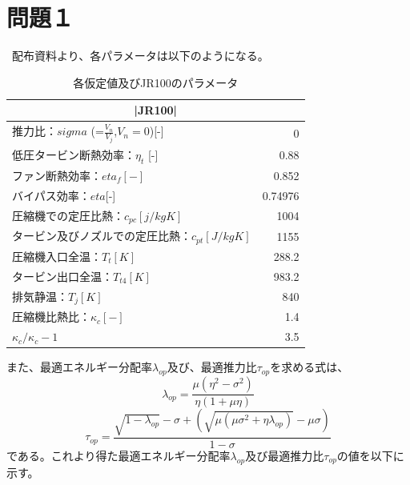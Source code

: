 \section*{\large 問題１}
\ 
配布資料より、各パラメータは以下のようになる。
\begin{table}[htb]
 \begin{center}
  \caption{各仮定値及びJR100のパラメータ}
  \begin{tabular}{|l|r|} \hline
   \multicolumn{2}{|c|}{|JR100|} \\ \hline
   推力比：$sigma$ (=$\frac{V_n}{V_j}$,$V_n=0$)[-] & 0 \\ \hline
   低圧タービン断熱効率：$\eta_t$ [-] & 0.88 \\ \hline
   ファン断熱効率：$eta_f[-]$ & 0.852 \\ \hline
   バイパス効率：$eta$[-] & 0.74976 \\ \hline
   圧縮機での定圧比熱：$c_{pc} [j/kg K]$ & 1004 \\ \hline
   タービン及びノズルでの定圧比熱：$c_{pt} [J/kg K]$ & 1155 \\ \hline
   圧縮機入口全温：$T_t[K]$ & 288.2 \\ \hline
   タービン出口全温：$T_{t4}[K]$ & 983.2 \\ \hline
   排気静温：$T_{j}[K]$ & 840 \\ \hline
   圧縮機比熱比：$\kappa_c [-]$ & 1.4 \\ \hline
   $\kappa_c/{\kappa_c -1}$ & 3.5 \\ \hline
  \end{tabular}
 \end{center}
\end{table}
また、最適エネルギー分配率$\lambda_{op}$及び、最適推力比$\tau_{op}$を求める式は、
\begin{equation}
 \lambda_{op}=\frac{\mu(\eta^2-\sigma^2)}{\eta(1+\mu \eta)}
\end{equation}
\begin{equation}
 \tau_{op}=\frac{\sqrt{1-\lambda_{op}} -\sigma +(\sqrt{\mu(\mu\sigma^2+\eta\lambda_{op})}-\mu\sigma)}{1-\sigma}
\end{equation}
である。これより得た最適エネルギー分配率$\lambda_{op}$及び最適推力比$\tau_{op}$の値を以下に示す。
